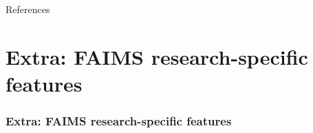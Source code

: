 \documentclass[
	aspectratio=169, %
	12pt, %
	t, %
]{beamer}
\begin{document}
\begin{refsegment}




\begin{frame}[allowframebreaks]{References}

\printbibliography[heading=none, segment=1]
\end{frame}

\section{Extra: FAIMS research-specific features}

\begin{sectionframe} %
	\frametitle{Extra: FAIMS research-specific features}


\end{sectionframe}






\end{refsegment}
\end{document}
